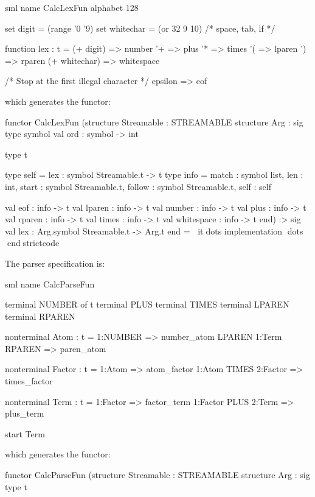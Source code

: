 \documentclass[10pt]{article}
\begin{document}
\begin{strictcode}
\begin{strictcode}
\begin{strictcode}
\begin{strictcode}
\begin{strictcode}
\begin{strictcode}
\begin{strictcode}
\begin{strictcode}
\begin{strictcode}
\begin{strictcode}
\begin{strictcode}
\begin{code}
sml
name CalcLexFun
alphabet 128

set digit = (range '0 '9)
set whitechar = (or 32 9 10)  /* space, tab, lf */

function lex : t =
  (+ digit) => number
  '+ => plus
  '* => times
  '( => lparen
  ') => rparen
  (+ whitechar) => whitespace

  /* Stop at the first illegal character */
  epsilon => eof
\end{code}

\noindent
which generates the functor:

\begin{strictcode}
functor CalcLexFun
   (structure Streamable : STREAMABLE
    structure Arg :
       sig
          type symbol
          val ord : symbol -> int

          type t

          type self = { lex : symbol Streamable.t -> t }
          type info = { match : symbol list,
                        len : int,
                        start : symbol Streamable.t,
                        follow : symbol Streamable.t,
                        self : self }

          val eof : info -> t
          val lparen : info -> t
          val number : info -> t
          val plus : info -> t
          val rparen : info -> t
          val times : info -> t
          val whitespace : info -> t
       end)
   :>
   sig
      val lex : Arg.symbol Streamable.t -> Arg.t
   end
= itdots implementation dots
endstrictcode

The parser specification is:

\begin{code}
sml
name CalcParseFun

terminal NUMBER of t
terminal PLUS
terminal TIMES
terminal LPAREN
terminal RPAREN

nonterminal Atom : t =
  1:NUMBER => number_atom
  LPAREN 1:Term RPAREN => paren_atom

nonterminal Factor : t =
  1:Atom => atom_factor
  1:Atom TIMES 2:Factor => times_factor

nonterminal Term : t =
  1:Factor => factor_term
  1:Factor PLUS 2:Term => plus_term

start Term
\end{code}

\noindent
which generates the functor:

\begin{strictcode}
functor CalcParseFun
   (structure Streamable : STREAMABLE
    structure Arg :
       sig
          type t


\end{strictcode}
\end{strictcode}
\end{strictcode}
\end{strictcode}
\end{strictcode}
\end{strictcode}
\end{strictcode}
\end{strictcode}
\end{strictcode}
\end{strictcode}
\end{strictcode}
\end{strictcode}
\end{strictcode}
\end{document}
